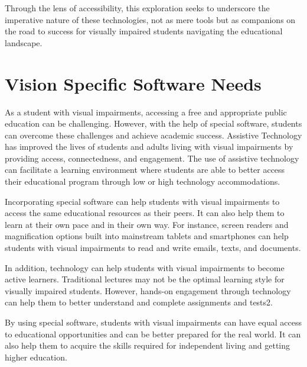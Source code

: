 Through the lens of accessibility, this exploration seeks to underscore the imperative nature of these technologies, not as mere tools but as companions on the road to success for visually impaired students navigating the educational landscape.

\pagebreak \hypertarget{software-needs}{}\section{Vision Specific Software Needs}\label{software-needs}
As a student with visual impairments, accessing a free and appropriate public education can be challenging. However, with the help of special software, students can overcome these challenges and achieve academic success. Assistive Technology has improved the lives of students and adults living with visual impairments by providing access, connectedness, and engagement. The use of assistive technology can facilitate a learning environment where students are able to better access their educational program through low or high technology accommodations.

Incorporating special software can help students with visual impairments to access the same educational resources as their peers. It can also help them to learn at their own pace and in their own way. For instance, screen readers and magnification options built into mainstream tablets and smartphones can help students with visual impairments to read and write emails, texts, and documents.

In addition, technology can help students with visual impairments to become active learners. Traditional lectures may not be the optimal learning style for visually impaired students. However, hands-on engagement through technology can help them to better understand and complete assignments and tests2.

By using special software, students with visual impairments can have equal access to educational opportunities and can be better prepared for the real world. It can also help them to acquire the skills required for independent living and getting higher education.

